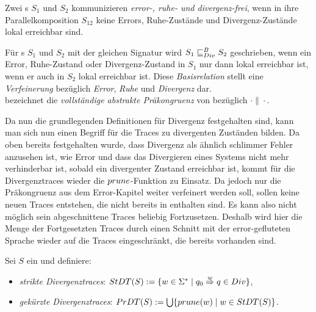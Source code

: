 \begin{Def}
  Zwei \EIO{}s $S_1$ und $S_2$ kommunizieren \emph{error-, ruhe- und
  divergenz-frei}, wenn in ihre Parallelkomposition $S_{12}$ keine Errors,
  Ruhe-Zustände und Divergenz-Zustände lokal erreichbar sind.
\end{Def}

\begin{Def}
\label{DefDivBasisrel}
Für \EIO{}s $S_1$ und $S_2$ mit der gleichen Signatur wird $S_1\sqsubseteq _{Div}^B S_2$
geschrieben, wenn ein Error, Ruhe-Zustand oder Divergenz-Zustand in $S_1$ nur
dann lokal erreichbar ist, wenn er auch in $S_2$ lokal erreichbar ist. Diese
\emph{Basisrelation} stellt eine \emph{Verfeinerung} bezüglich \emph{Error},
\emph{Ruhe} und \emph{Divergenz} dar.\\
\DCRel{} bezeichnet die \emph{vollständige abstrakte Präkongruenz} von \DBRel{}
bezüglich $\cdot\|\cdot$.
\end{Def}

Da nun die grundlegenden Definitionen für Divergenz festgehalten sind,
kann man sich nun einen Begriff für die Traces zu divergenten Zuständen
bilden. Da oben bereits festgehalten wurde, dass Divergenz als ähnlich
\glqq{}schlimmer\grqq{} Fehler anzusehen ist, wie Error und dass das Divergieren
eines Systems nicht mehr verhinderbar ist, sobald ein divergenter Zustand
erreichbar ist, kommt für die Divergenztraces wieder die $prune$-Funktion zu
Einsatz. Da jedoch nur die Präkongruenz aus dem Error-Kapitel weiter verfeinert
werden soll, sollen keine neuen Traces entstehen, die nicht bereits in \EL{}
enthalten sind. Es kann also nicht möglich sein abgeschnittene Traces beliebig
Fortzusetzen. Deshalb wird hier die Menge der Fortgesetzten Traces durch einen
Schnitt mit der error-gefluteten Sprache \EL{} wieder auf die Traces
eingeschränkt, die bereits vorhanden sind.

\begin{Def}[Divergenztraces]
  Sei $S$ ein \EIO{} und definiere:
  \begin{itemize}
    \item \emph{strikte Divergenztraces}: $StDT{}(S) := \{w\in\Sigma ^*\mid
      q_0 \overset{w}{\Rightarrow} q\in Div\}$,
    \item \emph{gekürzte Divergenztraces}: $PrDT{}(S) :=
      \bigcup\{prune{}(w)\mid w\in StDT{}(S)\}$.
  \end{itemize}
\end{Def}

